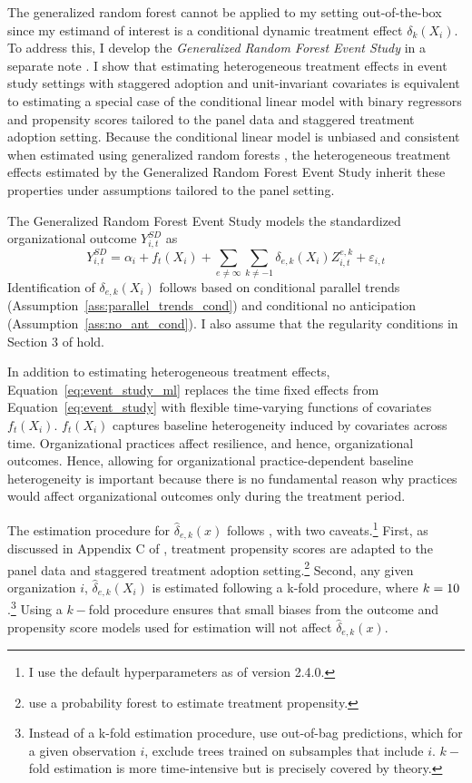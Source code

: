 \documentclass[12pt,notitlepage]{article}
\begin{document}
The generalized random forest cannot be applied to my setting out-of-the-box since my estimand of interest is a conditional dynamic treatment effect $\delta_k(X_i)$.
To address this, I develop the \textit{Generalized Random Forest Event Study} in a separate note \citep{liao_generalized_2025}.
I show that estimating heterogeneous treatment effects in event study settings with staggered adoption and unit-invariant covariates is equivalent to estimating a special case of the conditional linear model with binary regressors and propensity scores tailored to the panel data and staggered treatment adoption setting. 
Because the conditional linear model is unbiased and consistent when estimated using generalized random forests \citep{athey_generalized_2019}, the heterogeneous treatment effects estimated by the Generalized Random Forest Event Study inherit these properties under assumptions tailored to the panel setting.

The Generalized Random Forest Event Study models the standardized organizational outcome $Y_{i,t}^{SD}$ as
\begin{equation}\label{eq:event_study_ml}
Y_{i,t}^{SD} = \alpha_i + f_t(X_i) + \sum_{e \neq \infty} \sum_{k \neq -1} \delta_{e, k}(X_i) Z_{i,t}^{e,k} + \varepsilon_{i,t} 
\end{equation}
Identification of $\delta_{e, k}(X_i)$ follows based on conditional parallel trends (Assumption~\ref{ass:parallel_trends_cond}) and conditional no anticipation (Assumption~\ref{ass:no_ant_cond}).
I also assume that the regularity conditions in Section 3 of \cite{athey_generalized_2019} hold. 

In addition to estimating heterogeneous treatment effects, Equation~\ref{eq:event_study_ml} replaces the time fixed effects from Equation~\ref{eq:event_study} with flexible time-varying functions of covariates $f_t(X_i)$.
$f_t(X_i)$ captures baseline heterogeneity induced by covariates across time. 
Organizational practices affect resilience, and hence, organizational outcomes.
Hence, allowing for organizational practice-dependent baseline heterogeneity is important because there is no fundamental reason why practices would affect organizational outcomes only during the treatment period.

The estimation procedure for $\hat{\delta}_{e,k}(x)$ follows \cite{athey_generalized_2019}, with two caveats.\footnote{I use the default hyperparameters as of version 2.4.0.}
First, as discussed in Appendix C of \cite{liao_generalized_2025}, treatment propensity scores are adapted to the panel data and staggered treatment adoption setting.\footnote{\cite{athey_generalized_2019} use a probability forest to estimate treatment propensity. }
Second, any given organization $i$, $\hat{\delta}_{e, k}(X_i)$ is estimated following a k-fold procedure, where $k = 10$.\footnote{Instead of a k-fold estimation procedure, \cite{athey_generalized_2019} use out-of-bag predictions, which for a given observation $i$, exclude trees trained on subsamples that include $i$. $k-$fold estimation is more time-intensive but is precisely
covered by theory. }
Using a $k-$fold procedure ensures that small biases from the outcome and propensity score models used for estimation will not affect $\hat{\delta}_{e,k}(x)$.
\end{document}
